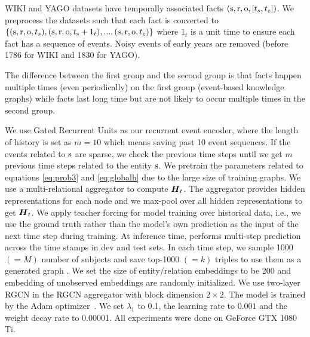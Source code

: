 WIKI and YAGO datasets have temporally associated facts $(\mathrm{s},\mathrm{r},\mathrm{o}, \allowbreak [t_s, t_e])$.
We preprocess the datasets such that each fact is converted to $\{(\mathrm{s},\mathrm{r},\mathrm{o}, t_s), (\mathrm{s},\mathrm{r},\mathrm{o},t_{\mathrm{s}}+1_t),...,(\mathrm{s},\mathrm{r},\mathrm{o},t_e)\}$ where $1_t$ is a unit time to ensure each fact has a sequence of events. Noisy events of early years are removed (before 1786 for WIKI and 1830 for YAGO). 

The difference between the first group and the second group is that facts happen multiple times (even periodically) on the first group (event-based knowledge graphs) while facts last long time but are not likely to occur multiple times in the second group.


We use Gated Recurrent Units \citep{Cho2014LearningPR} as our recurrent event encoder, where the length of history is set as $m = 10$ which means saving past 10 event sequences.
If the events related to $\mathrm{s}$ are sparse, we check the previous time steps until we get $m$ previous time steps related to the entity $\mathrm{s}$.
We pretrain the parameters related to equations \ref{eq:prob3} and \ref{eq:globalh} due to the large size of training graphs. 
We use a multi-relational aggregator to compute $\boldsymbol{H}_t$. The aggregator provides hidden representations for each node and we max-pool over all hidden representations to get $\boldsymbol{H}_t$.
We apply teacher forcing for model training over historical data, i.e., we use the ground truth rather than the model's own prediction as the input of the next time step during training.
At inference time, \method performs multi-step prediction across the time stamps in dev and test sets.
In each time step, we sample 1000 $(=M)$ number of subjects and save top-1000 $(=k)$ triples to use them as a generated graph .
We set the size of entity/relation embeddings to be 200 and embedding of unobserved embeddings are randomly initialized. 
We use two-layer RGCN in the RGCN aggregator with block dimension $2 \times 2$.
The model is trained by the Adam optimizer~\citep{kingma2014adam}.
We set $\lambda_1$ to 0.1, the learning rate to $0.001$ and the weight decay rate to 0.00001.
All experiments were done on GeForce GTX 1080 Ti.


